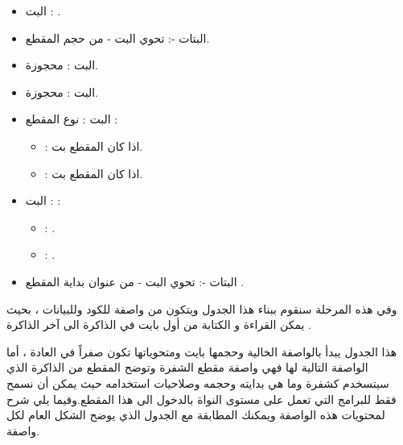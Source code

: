 \documentclass[document.tex]{subfiles}
\begin{document}
\begin{itemize}
\item البت : .
\item البتات -: تحوي البت  - من حجم المقطع.
\item البت : محجوزة.
\item البت : محجوزة.

\item البت : نوع المقطع :
\begin{itemize}
\item {}: اذا كان المقطع  بت.
\item {}: اذا كان المقطع  بت.

\end{itemize}

\item البت : :
\begin{itemize}
\item {}: .
\item {}: .

\end{itemize}

\item البتات -: تحوي البت  - من عنوان بداية المقطع .

\end{itemize}

وفي هذه المرحلة سنقوم ببناء هذا الجدول ويتكون من واصفة للكود وللبيانات ، بحيث يمكن القراءة و الكتابة من أول بايت في الذاكرة الى آخر الذاكرة . 

\begin{english}
\lstset{numberstyle=\tiny,numbersep=5pt,tabsize=2,extendedchars=true,breaklines=true,frame=b,showspaces=false, showtabs=false,xleftmargin=10pt,framexleftmargin=10pt,framexrightmargin=5pt,framexbottommargin=4pt,showstringspaces=false,language=[x86masm]Assembler}


\end{english}

هذا الجدول يبدأ بالواصفة الخالية  وحجمها  بايت ومتحوياتها تكون صفراً في العادة ، أما الواصفة التالية لها فهي واصفة مقطع الشفرة  وتوضح المقطع من الذاكرة الذي سيتسخدم كشفرة وما هي بدايته وحجمه وصلاحيات استخدامه حيث يمكن أن نسمح فقط للبرامج التي تعمل على مستوى النواة  بالدخول الى هذا المقطع.وفيما يلي شرح لمحتويات هذه الواصفة ويمكنك المطابقة مع الجدول الذي يوضح الشكل العام لكل واصفة.
\end{document}
